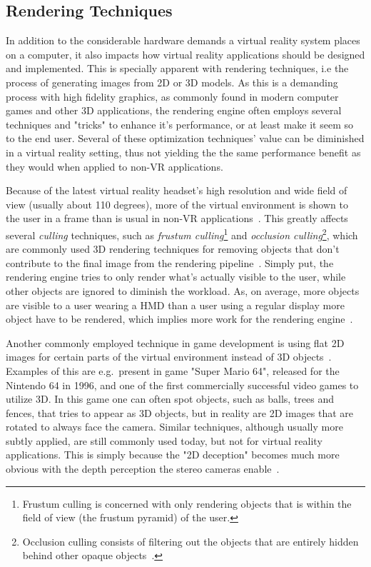 \subsection{Rendering Techniques}
In addition to the considerable hardware demands a virtual reality system places on a computer, it also impacts how virtual reality applications should be designed and implemented. 
This is specially apparent with rendering techniques, i.e the process of generating images from 2D or 3D models. 
As this is a demanding process with high fidelity graphics, as commonly found in modern computer games and other 3D applications, the rendering engine often employs several 
techniques and "tricks" to enhance it's performance, or at least make it seem so to the end user.
Several of these optimization techniques' value can be diminished in a virtual reality setting, thus not yielding the 
the same performance benefit as they would when applied to non-VR applications.

Because of the latest virtual reality headset's high resolution and wide field of view (usually about 110 degrees), 
more of the virtual environment is shown to the user in a frame than is usual in non-VR applications~\citep{Ohannessian2016}. 
This greatly affects several \textit{culling} techniques, such as 
\textit{frustum culling}\footnote{Frustum culling is concerned with only rendering objects that is within the field of view (the frustum pyramid) of the user.} and 
\textit{occlusion culling}\footnote{Occlusion culling consists of filtering out the objects that are entirely hidden behind other opaque objects~\citep{PerezFernandez2015}.}, 
which are commonly used 3D rendering techniques for removing objects that don't contribute to the final image from the rendering pipeline~\citep{Johnson2013}.
Simply put, the rendering engine tries to only render what's actually visible to the user, while other objects are ignored to diminish the workload. 
As, on average, more objects are visible to a user wearing a HMD than a user using a regular display more object have to be rendered, which implies more work for the rendering
engine~\citep{Ohannessian2016}. 

Another commonly employed technique in game development is using flat 2D images for certain parts of the virtual environment instead of 3D objects~\citep{Ohannessian2016}.
Examples of this are e.g.~present in game "Super Mario 64", released for the Nintendo 64 in 1996, and one of the first commercially successful video games to utilize 3D.
In this game one can often spot objects, such as balls, trees and fences, that tries to appear as 3D objects, but in reality are 2D images that are rotated to always face the camera. 
Similar techniques, although usually more subtly applied, are still commonly used today, but not for virtual reality applications.
This is simply because the "2D deception" becomes much more obvious with the depth perception the stereo cameras enable~\citep{Ohannessian2016}. 


